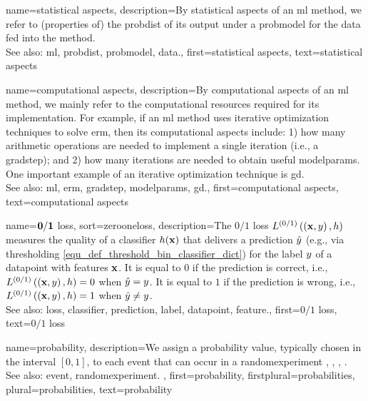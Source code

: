 {name={statistical aspects}, 
	description={By statistical aspects 
		of an \gls{ml} method, we refer to (properties of) the \gls{probdist} of its output 
		under a \gls{probmodel} for the \gls{data} fed into the method.
					\\ 
		See also: \gls{ml}, \gls{probdist}, \gls{probmodel}, \gls{data}.},
	first={statistical aspects},
	text={statistical aspects}
}

{name={computational aspects}, 
	description={By computational 
		aspects of an \gls{ml} method, we mainly refer to the computational 
		resources required for its implementation. For example, if an \gls{ml} method uses iterative 
		optimization techniques to solve \gls{erm}, then its computational aspects include: 1) how 
		many arithmetic operations are needed to implement a single iteration (i.e., a \gls{gradstep}); 
		and 2) how many iterations are needed to obtain useful \glspl{modelparam}. One important 
		example of an iterative optimization technique is \gls{gd}.
					\\ 
		See also: \gls{ml}, \gls{erm}, \gls{gradstep}, \glspl{modelparam}, \gls{gd}.}, 
	first={computational aspects},
	text={computational aspects}
}

{name={$\bf 0/1$ loss},
sort={zerooneloss}, 
	description={The $0/1$ \gls{loss} $L^{(0/1)}\left(\left( {\bf x},y \right),h \right)$ 
		measures the quality of a \gls{classifier} $h({\bf x})$ that delivers a 
		\gls{prediction} $\hat{y}$ (e.g., via thresholding \eqref{equ_def_threshold_bin_classifier_dict}) 
		for the \gls{label} $y$ of a \gls{datapoint} with \glspl{feature} ${\bf x}$. It is equal to $0$ if 
		the \gls{prediction} is correct, i.e., 
		$L^{(0/1)}\left(\left( {\bf x},y \right),h \right)=0$ when $\hat{y}=y$. It is 
		equal to $1$ if the \gls{prediction} is wrong, i.e., $L^{(0/1)}\left(\left( {\bf x},y \right),h \right)=1$ 
		when $\hat{y}\neq y$.
				\\ 
		See also: \gls{loss}, \gls{classifier}, \gls{prediction}, \gls{label}, \gls{datapoint}, \gls{feature}.},
    	first={$0/1$ loss},
	text={$0/1$ loss}
}

{name={probability}, 
	description={We assign a probability value, typically chosen in the 
		interval $[0,1]$, to each \gls{event} that can occur in a \gls{randomexperiment}  
		\cite{BillingsleyProbMeasure}, \cite{BertsekasProb}, \cite{HalmosMeasure},  \cite{KallenbergBook}.
		\\
		See also: \gls{event}, \gls{randomexperiment}. },
	first={probability},
	firstplural={probabilities},
	plural={probabilities},
	text={probability}
}
	
